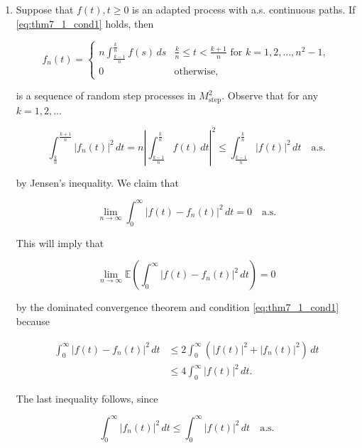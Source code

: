 \begin{Proof}
\begin{enumerate}
\item Suppose that $f(t), t \geq 0$ is an adapted process with a.s. continuous paths. If \eqref{eq:thm7_1_cond1} holds, then

\begin{equation}
f_n(t) = \begin{cases}
n \int_{\frac{k-1}{n}}^{\frac{k}{n}} f(s) \, ds & \frac{k}{n} \leq t < \frac{k+1}{n} \text{ for } k = 1, 2, \ldots, n^2 - 1, \\
0 & \text{otherwise},
\end{cases}
\label{eq:fn_def}
\end{equation}

is a sequence of random step processes in $M_{\mathrm{step}}^2$. Observe that for any $k = 1, 2, \ldots$

\begin{equation}
\int_{\frac{k}{n}}^{\frac{k+1}{n}} |f_n(t)|^2 \, dt = n \left|\int_{\frac{k-1}{n}}^{\frac{k}{n}} f(t) \, dt\right|^2 \leq \int_{\frac{k-1}{n}}^{\frac{k}{n}} |f(t)|^2 \, dt \quad \text{a.s.}
\label{eq:fn_inequality}
\end{equation}

by Jensen's inequality. We claim that

\begin{equation}
\lim_{n \to \infty} \int_0^\infty |f(t) - f_n(t)|^2 \, dt = 0 \quad \text{a.s.}
\end{equation}

This will imply that

\begin{equation}
\lim_{n \to \infty} \mathbb{E}\left(\int_0^\infty |f(t) - f_n(t)|^2 \, dt\right) = 0
\end{equation}

by the dominated convergence theorem and condition \eqref{eq:thm7_1_cond1} because

\begin{align}
\int_0^\infty |f(t) - f_n(t)|^2 \, dt & \leq 2 \int_0^\infty \left(|f(t)|^2 + |f_n(t)|^2\right) \, dt \\
& \leq 4 \int_0^\infty |f(t)|^2 \, dt.
\end{align}

The last inequality follows, since

\begin{equation}
\int_0^\infty |f_n(t)|^2 \, dt \leq \int_0^\infty |f(t)|^2 \, dt \quad \text{a.s.}
\end{equation}


\end{enumerate}
\end{Proof}

